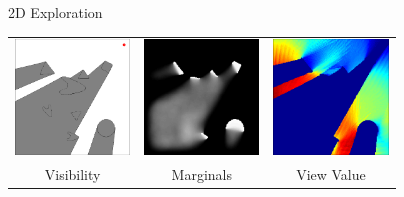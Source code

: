 \begin{tframe}{2D Exploration}
\begin{center}

\bigskip
\begin{tabular}{ccc}
\includegraphics[width=1.2in]{media_exploration/2D_scene_01}&
\includegraphics[width=1.2in]{media_exploration/2D_marginal_01}&
\includegraphics[width=1.2in]{media_exploration/2D_energy_01}
\\ Visibility & Marginals & View Value
\end{tabular}
\end{center}
\end{tframe}

